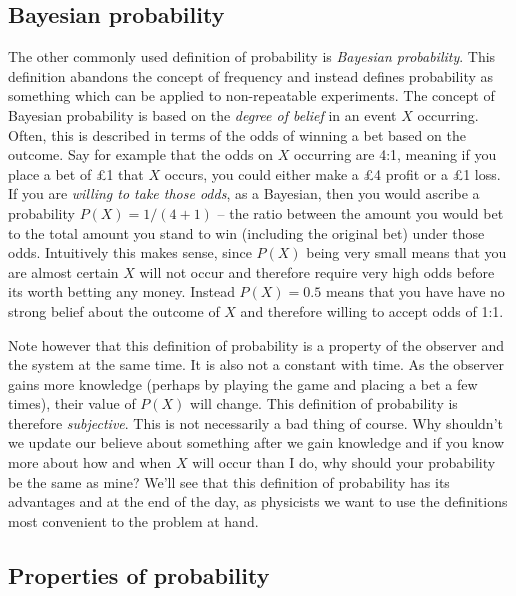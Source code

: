 \subsection{Bayesian probability}

The other commonly used definition of probability is \emph{Bayesian probability}. This definition abandons the concept of frequency and instead defines probability as something which can be applied to non-repeatable experiments. The concept of Bayesian probability is based on the \emph{degree of belief} in an event $X$ occurring. Often, this is described in terms of the odds of winning a bet based on the outcome. Say for example that the odds on $X$ occurring are 4:1, meaning if you place a bet of £1 that $X$ occurs, you could either make a £4 profit or a £1 loss. If you are \emph{willing to take those odds}, as a Bayesian, then you would ascribe a probability $P(X)=1/(4+1)$ -- the ratio between the amount you would bet to the total amount you stand to win (including the original bet) under those odds.  Intuitively this makes sense, since $P(X)$ being very small means that you are almost certain $X$ will not occur and therefore require very high odds before its worth betting any money. Instead $P(X)=0.5$ means that you have have no strong belief about the outcome of $X$ and therefore willing to accept odds of 1:1. 

Note however that this definition of probability is a property of the observer and the system at the same time. It is also not a constant with time. As the observer gains more knowledge (perhaps by playing the game and placing a bet a few times), their value of $P(X)$ will change. This definition of probability is therefore \emph{subjective}. This is not necessarily a bad thing of course. Why shouldn't we update our believe about something after we gain knowledge and if you know more about how and when $X$ will occur than I do, why should your probability be the same as mine? We'll see that this definition of probability has its advantages and at the end of the day, as physicists we want to use the definitions most convenient to the problem at hand. 


\subsection{Properties of probability}

